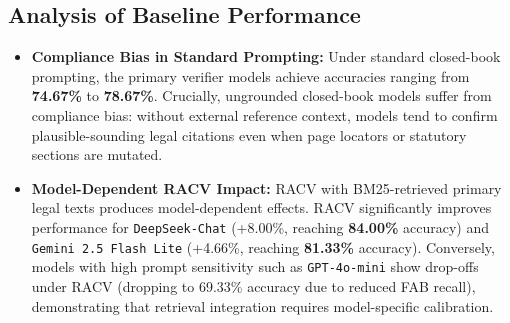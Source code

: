 \documentclass[conference]{IEEEtran}
\begin{document}
\subsection{Analysis of Baseline Performance}
\begin{itemize}
\item \textbf{Compliance Bias in Standard Prompting:} Under standard closed-book prompting, the primary verifier models achieve accuracies ranging from \textbf{74.67\%} to \textbf{78.67\%}. Crucially, ungrounded closed-book models suffer from compliance bias: without external reference context, models tend to confirm plausible-sounding legal citations even when page locators or statutory sections are mutated.
\item \textbf{Model-Dependent RACV Impact:} RACV with BM25-retrieved primary legal texts produces model-dependent effects. RACV significantly improves performance for \texttt{DeepSeek-Chat} (+8.00\%, reaching \textbf{84.00\%} accuracy) and \texttt{Gemini 2.5 Flash Lite} (+4.66\%, reaching \textbf{81.33\%} accuracy). Conversely, models with high prompt sensitivity such as \texttt{GPT-4o-mini} show drop-offs under RACV (dropping to 69.33\% accuracy due to reduced FAB recall), demonstrating that retrieval integration requires model-specific calibration.
\end{itemize}
\end{document}
